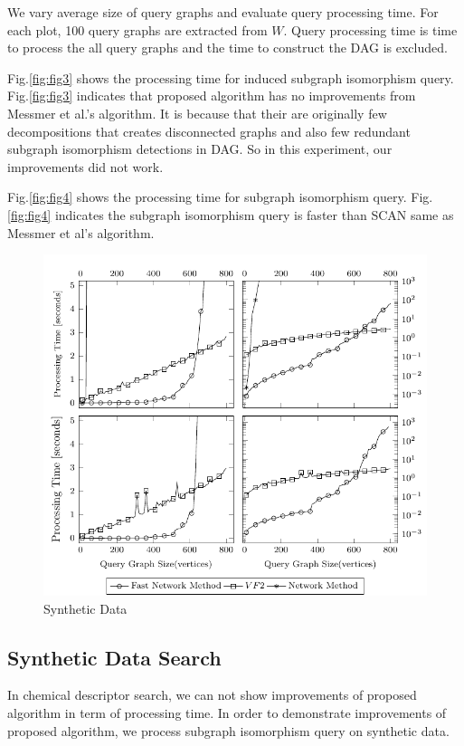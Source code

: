 We vary average size of query graphs and evaluate query processing time.
For each plot, 100 query graphs are extracted from $W$.
Query processing time is time to process the all query graphs and the time to construct the DAG is excluded.

Fig.\ref{fig:fig3} shows the processing time for induced subgraph isomorphism query.
Fig.\ref{fig:fig3} indicates that proposed algorithm has no improvements from Messmer et al.'s algorithm.
It is because that their are originally few decompositions that creates disconnected graphs and also few redundant subgraph isomorphism detections in DAG.
So in this experiment, our improvements did not work.

Fig.\ref{fig:fig4} shows the processing time for subgraph isomorphism query.
Fig.\ref{fig:fig4} indicates the subgraph isomorphism query is faster than SCAN same as Messmer et al's algorithm.

\begin{figure}[h]
\centering
\includegraphics[width=1.0\textwidth]{images/syndataplot.pdf}
\caption{Synthetic Data}
\label{fig:fig91}
\end{figure}
%

\subsection{Synthetic Data Search}
In chemical descriptor search, we can not show improvements of proposed algorithm in term of processing time.
In order to demonstrate improvements of proposed algorithm, we process subgraph isomorphism query on synthetic data.

